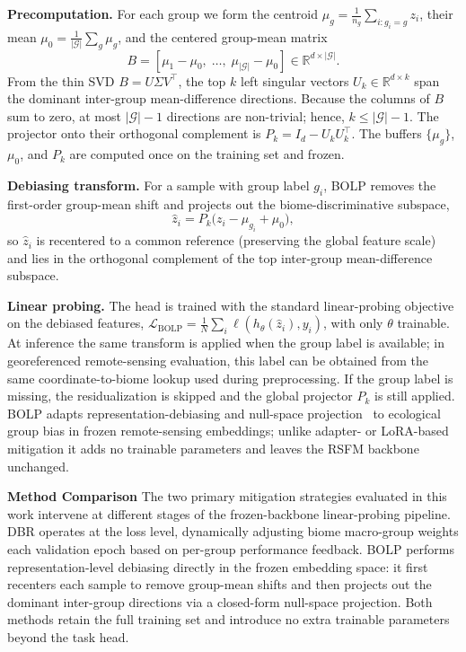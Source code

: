 \documentclass[10pt,twocolumn,letterpaper]{article}
\begin{document}
\textbf{Precomputation.} For each group we form the centroid $\mu_g=\frac{1}{n_g}\sum_{i:g_i=g}z_i$, their mean $\mu_0=\frac{1}{|\mathcal{G}|}\sum_{g}\mu_g$, and the centered group-mean matrix
\begin{equation}
B=\left[\mu_{1}-\mu_{0},\;\ldots,\;\mu_{|\mathcal{G}|}-\mu_{0}\right]\in\mathbb{R}^{d\times|\mathcal{G}|}.
\end{equation}
From the thin SVD $B=U\Sigma V^{\top}$, the top $k$ left singular vectors $U_k\in\mathbb{R}^{d\times k}$ span the dominant inter-group mean-difference directions. Because the columns of $B$ sum to zero, at most $|\mathcal{G}|-1$ directions are non-trivial; hence, $k\le|\mathcal{G}|-1$. The projector onto their orthogonal complement is $P_k=I_d-U_kU_k^{\top}$. The buffers $\{\mu_g\}$, $\mu_0$, and $P_k$ are computed once on the training set and frozen.

\textbf{Debiasing transform.} For a sample with group label $g_i$, BOLP removes the first-order group-mean shift and projects out the biome-discriminative subspace,
\begin{equation}
\hat{z}_i=P_k\big(z_i-\mu_{g_i}+\mu_0\big),
\end{equation}
so $\hat{z}_i$ is recentered to a common reference (preserving the global feature scale) and lies in the orthogonal complement of the top inter-group mean-difference subspace.

\textbf{Linear probing.} The head is trained with the standard linear-probing objective on the debiased features, $\mathcal{L}_{\mathrm{BOLP}}=\frac{1}{N}\sum_{i}\ell(h_\theta(\hat{z}_i),y_i)$, with only $\theta$ trainable. At inference the same transform is applied when the group label is available; in georeferenced remote-sensing evaluation, this label can be obtained from the same coordinate-to-biome lookup used during preprocessing. If the group label is missing, the residualization is skipped and the global projector $P_k$ is still applied. BOLP adapts representation-debiasing and null-space projection~\cite{bolukbasi2016man,ravfogel2020null} to ecological group bias in frozen remote-sensing embeddings; unlike adapter- or LoRA-based mitigation it adds no trainable parameters and leaves the RSFM backbone unchanged.

\smallskip
\noindent\textbf{Method Comparison}
The two primary mitigation strategies evaluated in this work intervene at different stages of the frozen-backbone linear-probing pipeline. DBR operates at the loss level, dynamically adjusting biome macro-group weights each validation epoch based on per-group performance feedback. BOLP performs representation-level debiasing directly in the frozen embedding space: it first recenters each sample to remove group-mean shifts and then projects out the dominant inter-group directions via a closed-form null-space projection. Both methods retain the full training set and introduce no extra trainable parameters beyond the task head.
\end{document}

